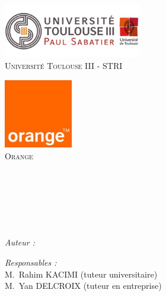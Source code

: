 %
\begin{titlepage}
    \begin{center}
        \begin{minipage}[t]{0.48\textwidth}
            \begin{flushleft}
                \includegraphics [width=60mm]{images/UT3-logo.jpg} \\[0.5cm]
                    \textsc{Université Toulouse III - STRI}
            \end{flushleft}
        \end{minipage}
        \begin{minipage}[t]{0.48\textwidth}
            \begin{flushright}
                \includegraphics [width=30mm]{images/orange-logo.jpg} \\[0.5cm]
                \textsc{Orange}
            \end{flushright}
        \end{minipage} \\[6.5cm]
        \textsc{\Large \reportsubject}\\[0.5cm]
        \HRule \\[0.4cm]
        {\huge \bfseries \reporttitle}\\[0.4cm]
        \HRule \\[1.7cm]
        \begin{minipage}[t]{0.3\textwidth}
            \begin{flushleft} \large
                \emph{Auteur :}\\
                \reportauthor
            \end{flushleft}
        \end{minipage}
        \begin{minipage}[t]{0.6\textwidth}
            \begin{flushright} \large
                \emph{Responsables :} \\
                M.~Rahim \textsc{KACIMI} (tuteur universitaire)\\
                M.~Yan \textsc{DELCROIX} (tuteur en entreprise)
            \end{flushright}
        \end{minipage}
        \vfill
        {\large \reportdate}
    \end{center}
%
\end{titlepage}
